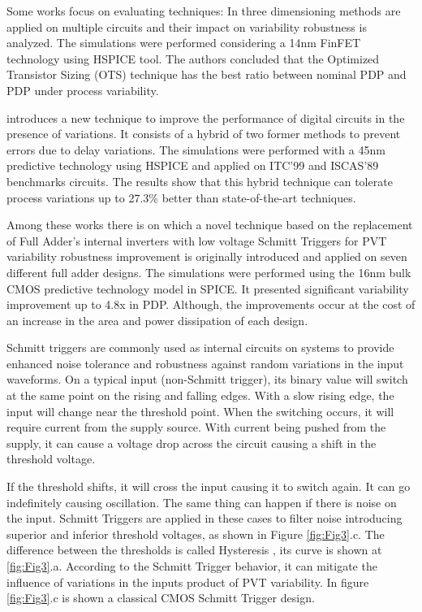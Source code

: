 \documentclass[ecp,tc, english]{iiufrgs}
\begin{document}
Some works focus on evaluating techniques: In \cite{zimpeck2016finfet} three dimensioning methods are applied on multiple circuits and their impact on variability robustness is analyzed. The simulations were performed considering a 14nm FinFET technology using HSPICE tool. The authors concluded that the Optimized Transistor Sizing (OTS) technique has the best ratio between nominal PDP and PDP under process variability.

\cite{ahmadi2017hybrid} introduces a new technique to improve the performance of digital circuits in the presence of variations. It consists of a hybrid of two former methods to prevent errors due to delay variations. The simulations were performed with a 45nm predictive technology using HSPICE and applied on ITC’99 and ISCAS’89 benchmarks circuits. The results show that this hybrid technique can tolerate process variations up to 27.3\% better than state-of-the-art techniques.

Among these works there is \cite{dokania2015circuit} on which a novel technique based on the replacement of Full Adder’s internal inverters with low voltage Schmitt Triggers for PVT variability robustness improvement is originally introduced and applied on seven different full adder designs. The simulations were performed using the 16nm bulk CMOS predictive technology model in SPICE. It presented significant variability improvement up to 4.8x in PDP. Although, the improvements occur at the cost of an increase in the area and power dissipation of each design.    

Schmitt triggers are commonly used as internal circuits on systems to provide enhanced noise tolerance and robustness against random variations in the input waveforms. On a typical input (non-Schmitt trigger), its binary value will switch at the same point on the rising and falling edges. With a slow rising edge, the input will change near the threshold point. When the switching occurs, it will require current from the supply source. With current being pushed from the supply, it can cause a voltage drop across the circuit causing a shift in the threshold voltage. 

If the threshold shifts, it will cross the input causing it to switch again. It can go indefinitely causing oscillation. The same thing can happen if there is noise on the input. Schmitt Triggers are applied in these cases to filter noise introducing superior and inferior threshold voltages, as shown in Figure \ref{fig:Fig3}.c. The difference between the thresholds is called Hysteresis \cite{WinNT}, its curve is shown at \ref{fig:Fig3}.a. According to the Schmitt Trigger behavior, it can mitigate the influence of variations in the inputs product of PVT variability. In figure \ref{fig:Fig3}.c is shown a classical CMOS Schmitt Trigger design. 
\end{document}

